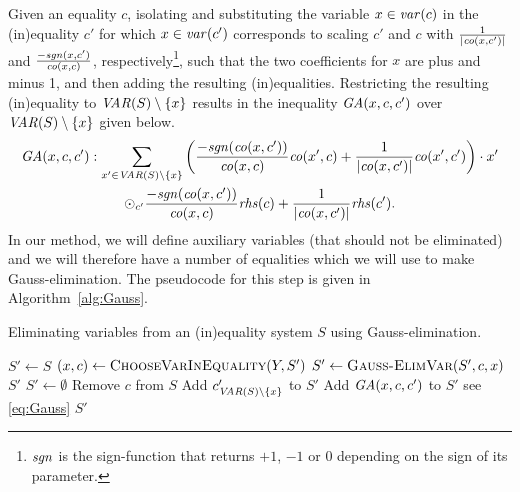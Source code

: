 Given an equality $c$, %
isolating and substituting the variable $x\in \mathit{var}(c)$ in the (in)equality $c'$ for which $x\in\mathit{var}(c')$ %
corresponds to scaling $c'$ and $c$ with $\frac{1}{|\mathit{co}(x,c')|}$ and $\frac{-\mathit{sgn}(x,c')}{\mathit{co}(x,c)}$, respectively\footnote{$\mathit{sgn}$ is the sign-function that returns $+1$, $-1$ or $0$ depending on the sign of its parameter.}, such that the two coefficients for $x$ are plus and minus 1, and then adding the resulting (in)equalities. Restricting the resulting (in)equality to $\mathit{VAR}(S)\setminus\{x\}$ results in the inequality $\mathit{GA}(x,c,c')$ over $\mathit{VAR}(S)\setminus\{x\}$ given below. %
\begin{multline}
\label{eq:Gauss}
\mathit{GA}(x,c,c'):
\sum_{x'\in\mathit{VAR}(S)\setminus\{x\}}
\left(  \frac{-\mathit{sgn}(\mathit{co}(x, c'))}{\mathit{co}(x,c)}\mathit{co}(x',c) 
+ \frac{1}{|\mathit{co}(x, c')|}\mathit{co}(x',c')\right)\cdot x' \\
\odot_{c'} \frac{-\mathit{sgn}(\mathit{co}(x, c'))}{\mathit{co}(x,c)}\mathit{rhs}(c)+ \frac{1}{|\mathit{co}(x,c')|}\mathit{rhs}(c').
\end{multline} 
%
In our method, we will define auxiliary variables (that should not be eliminated) and we will therefore have a number of equalities which we will use to make Gauss-elimination. The pseudocode for this step is given in Algorithm~\ref{alg:Gauss}.
%
\begin{algorithm}
\caption{Eliminating variables from an (in)equality system $S$ using Gauss-elimination.}\label{alg:Gauss}
\begin{algorithmic}[1]
\State $S'\gets S$
	\State $(x, c) \gets \Call{ChooseVarInEquality}{Y,S'}$ 
	\State $S'\gets \Call{Gauss-ElimVar}{S', c, x}$
\EndWhile
\State\Return $S'$
\Statex
{}
	\State $S'\gets \emptyset$
	\State Remove $c$ from $S$
			\State Add $c'_{\mathit{VAR}(S)\setminus\{x\}}$ to $S'$
		\Else
			\State Add $\mathit{GA}(x,c,c')$ to $S'$ \Comment see \eqref{eq:Gauss}
		\EndIf
	\EndFor
	\State \Return $S'$ 
\EndFunction
\EndFunction
\end{algorithmic}
\end{algorithm}
